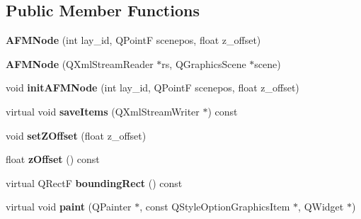 \subsection*{Public Member Functions}
\begin{DoxyCompactItemize}
\item 
{\bfseries A\+F\+M\+Node} (int lay\+\_\+id, Q\+PointF scenepos, float z\+\_\+offset)\hypertarget{classprim_1_1AFMNode_adc6bf443ccb51efe21ea6bf6c77b92ef}{}\label{classprim_1_1AFMNode_adc6bf443ccb51efe21ea6bf6c77b92ef}

\item 
{\bfseries A\+F\+M\+Node} (Q\+Xml\+Stream\+Reader $\ast$rs, Q\+Graphics\+Scene $\ast$scene)\hypertarget{classprim_1_1AFMNode_a13bd3f177bf2046e5b96567a2d40970f}{}\label{classprim_1_1AFMNode_a13bd3f177bf2046e5b96567a2d40970f}

\item 
void {\bfseries init\+A\+F\+M\+Node} (int lay\+\_\+id, Q\+PointF scenepos, float z\+\_\+offset)\hypertarget{classprim_1_1AFMNode_a016c3ceff5329e9d1e90952d59429cb7}{}\label{classprim_1_1AFMNode_a016c3ceff5329e9d1e90952d59429cb7}

\item 
virtual void {\bfseries save\+Items} (Q\+Xml\+Stream\+Writer $\ast$) const \hypertarget{classprim_1_1AFMNode_ab23535932fc385ee7e0d095a4751adba}{}\label{classprim_1_1AFMNode_ab23535932fc385ee7e0d095a4751adba}

\item 
void {\bfseries set\+Z\+Offset} (float z\+\_\+offset)\hypertarget{classprim_1_1AFMNode_ad080b42722ff4f82871bd2064dec4352}{}\label{classprim_1_1AFMNode_ad080b42722ff4f82871bd2064dec4352}

\item 
float {\bfseries z\+Offset} () const \hypertarget{classprim_1_1AFMNode_a13940e18d8607133dd8f05f374a44cb5}{}\label{classprim_1_1AFMNode_a13940e18d8607133dd8f05f374a44cb5}

\item 
virtual Q\+RectF {\bfseries bounding\+Rect} () const \hypertarget{classprim_1_1AFMNode_a8dfcc69d74a0ee4a02e08b220df00a3a}{}\label{classprim_1_1AFMNode_a8dfcc69d74a0ee4a02e08b220df00a3a}

\item 
virtual void {\bfseries paint} (Q\+Painter $\ast$, const Q\+Style\+Option\+Graphics\+Item $\ast$, Q\+Widget $\ast$)\hypertarget{classprim_1_1AFMNode_a397224a3ecc82aceacaf256924b342a6}{}\label{classprim_1_1AFMNode_a397224a3ecc82aceacaf256924b342a6}


\end{DoxyCompactItemize}
